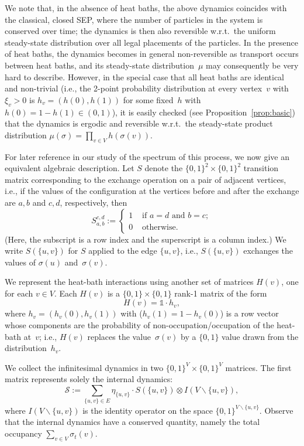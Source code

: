 \documentclass[11pt]{article}
\theoremstyle{plain}
\theoremstyle{definition}
\theoremstyle{remark}
\numberwithin{equation}{section}
\newcommand{\be}{\begin{equation}}
\newcommand{\ee}{\end{equation}}
\newcommand{\one}{\mathbb{1}}
\newcommand{\cSin}{{\mathcal S}}
\begin{document}
We note that, in the absence of heat baths, the above dynamics coincides with the classical, closed SEP,
where the number of particles in the system is conserved over time; the dynamics is then also reversible
w.r.t.\ the uniform steady-state distribution over all legal placements of the particles.  In the presence of heat baths,
the dynamics becomes in general non-reversible as transport occurs between heat baths,
and its steady-state distribution~$\mu$ may consequently be very hard to describe.  
However, in the special case that all heat baths are identical and non-trivial (i.e., the 2-point probability distribution
at every vertex~$v$ with $\xi_v>0$ is $h_v=(h(0),h(1))$ for some fixed~$h$ with $h(0)=1-h(1)\in (0,1)$),
it is easily checked (see Proposition~\ref{prop:basic})
that the dynamics is ergodic and reversible w.r.t.\ the steady-state product
distribution $\mu(\sigma)=\prod_{v\in V} h(\sigma(v))$.  

For later reference in our study of the spectrum of this process, we now give an equivalent algebraic description.
Let $S$ denote the $\{0,1\}^2\times\{0,1\}^2$ transition matrix corresponding to the exchange operation on 
a pair of adjacent vertices, i.e., if the values of the configuration at the vertices before and after the exchange are $a,b$ and $c,d$,
respectively, then
\be S_{a,b}^{c,d} := \begin{cases} 1 & \text{ if } a=d \text{ and } b=c; \\ 
0 & \text{ otherwise. }\end{cases} \label{exchop} \ee
(Here, the subscript is a row index and the superscript is a column index.)  We write $S(\{u,v\})$ for $S$
applied to the edge $\{u,v\}$, i.e., $S(\{u,v\})$ exchanges the values of $\sigma(u)$ and~$\sigma(v)$.

We represent the heat-bath interactions using another set of matrices $H(v)$, one
for each $v\in V$.  Each $H(v)$ is a $\{0,1\}\times\{0,1\}$ rank-1 matrix of the form
\be H(v)=\one \cdot h_v, \label{mmylss} \ee
where $h_v=(h_v(0),h_v(1))$ with ($h_v(1)=1-h_v(0)$) is a row vector whose components are the probability of
non-occupation/occupation of the heat-bath at~$v$; i.e., $H(v)$ replaces the value~$\sigma(v)$ by 
a $\{0,1\}$ value drawn from the distribution~$h_v$.

We collect the infinitesimal dynamics in two $\{0,1\}^V \times \{0,1\}^V$ matrices.
The first matrix represents solely the internal dynamics:
\begin{equation}\label{Sin}
 \cSin := \sum_{\{u,v\}\in E} \eta_{\{u,v\}} \cdot S(\{u,v\}) \otimes I(V\backslash \{u,v\}),
\end{equation}
where $I(V\backslash \{u,v\})$ is the identity operator on the space $\{0,1\}^{V\backslash \{u,v\}}$. 
Observe that the internal dynamics have a conserved quantity, namely the total occupancy $\sum_{v\in V} \sigma_t(v)$. 
\end{document}
